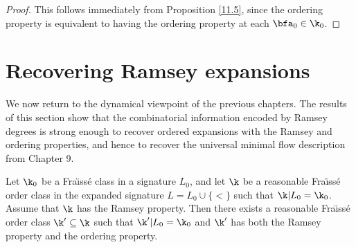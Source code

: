 \begin{proof}
    This follows immediately from Proposition \ref{11.5}, since the ordering property is equivalent to having the ordering property at each $\bfa_0\in\k_0$.
\end{proof}


\section{Recovering Ramsey expansions}

We now return to the dynamical viewpoint of the previous chapters. The results of this section show that the combinatorial information encoded by Ramsey degrees is strong enough to recover ordered expansions with the Ramsey and ordering properties, and hence to recover the universal minimal flow description from Chapter 9.

\begin{theorem}
    \label{11.7}
    Let $\k_0$ be a Fra\"{\i}ss\'e class in a signature $L_0$, and let $\k$ be a reasonable Fra\"{\i}ss\'e order class in the expanded signature \(L=L_0\cup\{<\}\) such that $\k|L_0=\k_0$. Assume that $\k$ has the Ramsey property. Then there exists a reasonable Fra\"{\i}ss\'e order class \(\k'\subseteq\k\) such that $\k'|L_0=\k_0$ and $\k'$ has both the Ramsey property and the ordering property.
\end{theorem}

